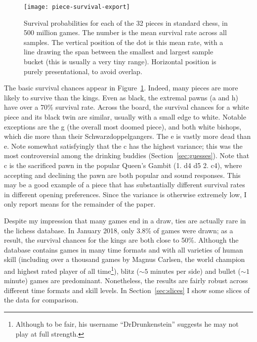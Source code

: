 \documentclass[twocolumn]{article}
\newcommand{\Pawn}[1][1.3ex]{%
\adjustbox{Trim=4.3pt 2.6pt 4.3pt 0pt,width=#1,margin=0.2ex 0ex 0.2ex 0ex}{\BlackPawnOnWhite}%
}%
\begin{document}
\begin{figure}[t]
  \begin{center}
    \texttt{[image: piece-survival-export]}
  \end{center}\vspace{-0.1in}
  \caption{Survival probabilities for each of the 32 pieces in standard
    chess, in 500 million games. The number is the mean survival rate
    across all samples. The vertical position of the dot is this mean
    rate, with a line drawing the span between the smallest and largest
    sample bucket (this is usually a very tiny range).
    Horizontal position is purely presentational, to avoid overlap.}
  \label{fig:piece-survival}
\end{figure}

The basic survival chances appear in Figure~\ref{fig:piece-survival}.
Indeed, many pieces are more likely to survive than the kings. Even as
black, the extremal pawns (\pawn a and \pawn h) have over a 70\%
survival rate. Across the board, the survival chances for a white
piece and its black twin are similar, usually with a small edge to
white. Notable exceptions are the \knight g (the overall most doomed
piece), and both white bishops, which die more than their
Schwarzdoppelgangers. The \pawn e is vastly more dead than \Pawn e.
Note somewhat satisfyingly that the \pawn c has the highest variance;
this was the most controversial among the drinking buddies
(Section~\ref{sec:guesses}). Note that \pawn c is the sacrificed
pawn in the popular Queen's Gambit (1. d4 d5 2. c4), where accepting
and declining the pawn are both popular and sound responses. This may
be a good example of a piece that has substantially different survival
rates in different opening preferences. Since the variance is
otherwise extremely low, I only report means for the remainder of the
paper.

Despite my impression that many games end in a draw, ties are actually
rare in the lichess database. In January 2018, only 3.8\% of games
were drawn;
as a result, the survival chances for the kings are both close to
50\%. Although the database contains games in many time formats and
with all varieties of human skill (including over a thousand games by
Magnus Carlsen, the world champion and highest rated player of all
time\footnote{Although to be fair, his username ``DrDrunkenstein''
  suggests he may not play at full strength.}), blitz ($\sim\! 5$
minutes per side) and bullet ($\sim\! 1$ minute) games are
predominant. Nonetheless, the results are fairly robust across
different time formats and skill levels. In Section~\ref{sec:slices} I
show some slices of the data for comparison.
\end{document}
